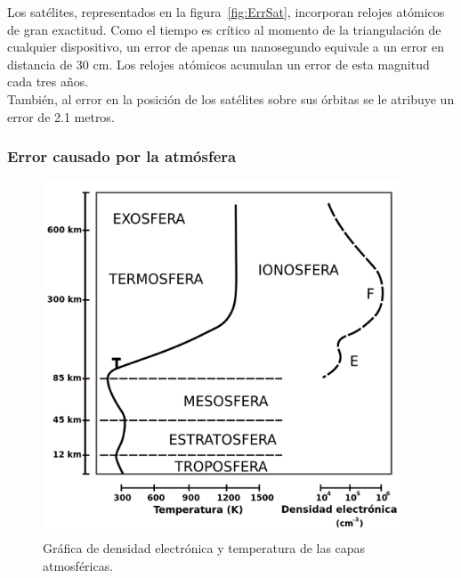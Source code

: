 
Los satélites, representados en la figura~\ref{fig:ErrSat}, incorporan relojes atómicos de gran exactitud. Como el tiempo es crítico al momento de la triangulación de cualquier dispositivo, un error de apenas un nanosegundo equivale a un error en distancia de 30 cm. Los relojes atómicos acumulan un error de esta magnitud cada tres años. \\

También, al error en la posición de los satélites sobre sus órbitas se le atribuye un error de 2.1 metros.

\subsubsection{Error causado por la atmósfera}

\begin{figure}[H]
\centering
\includegraphics[width=0.95\textwidth]{Figures/GraficaErrAtm}
\caption[Error por capas de la Atmósfera.]{Gráfica de densidad electrónica y temperatura de las capas atmosféricas\footnotemark.}
\label{fig:ErrGAtm}
\end{figure}


